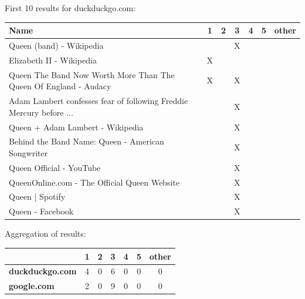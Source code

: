 \documentclass[10pt,a4paper]{article}
\begin{document}
\begin{enumerate}
        First 10 results for duckduckgo.com:\\
        \hspace*{-2cm}\begin{tabular}{|p{}||c|c|c|c|c|c|}
            \hline
            \textbf{Name} & \textbf{1} & \textbf{2} & \textbf{3} & \textbf{4} & \textbf{5} & \textbf{other}\\
            \hline
            Queen (band) - Wikipedia&&&X&&&\\
            Elizabeth II - Wikipedia&X&&&&&\\
            Queen The Band Now Worth More Than The Queen Of England - Audacy&X&&X&&&\\
            Adam Lambert confesses fear of following Freddie Mercury before ...&&&X&&&\\
            Queen + Adam Lambert - Wikipedia&&&X&&&\\
            Behind the Band Name: Queen - American Songwriter&&&X&&&\\
            Queen Official - YouTube&&&X&&&\\
            QueenOnline.com - The Official Queen Website&&&X&&&\\
            Queen | Spotify&&&X&&&\\
            Queen - Facebook&&&X&&&\\
            \hline
        \end{tabular}
        
        Aggregation of results:\\
        \begin{tabular}{|l||c|c|c|c|c|c|}
            \hline
            & \textbf{1} & \textbf{2} & \textbf{3} & \textbf{4} & \textbf{5} & \textbf{other}\\
            \hline
            \textbf{duckduckgo.com} & 4&0&6&0&0&0\\
            \textbf{google.com} & 2&0&9&0&0&0\\
            \hline
        \end{tabular}
        

\end{enumerate}
\end{document}
